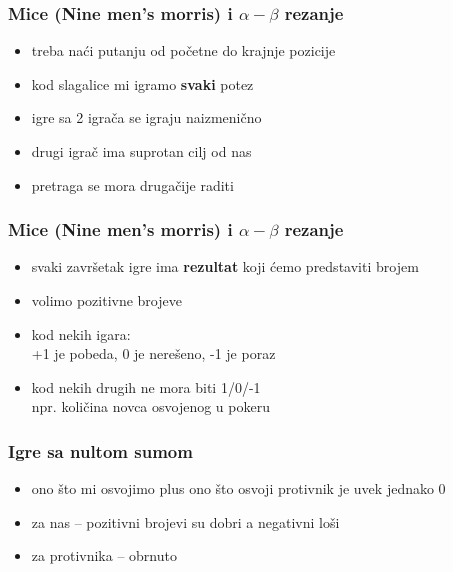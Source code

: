 \documentclass[compress,aspectratio=169]{beamer}
\begin{document}
\begin{frame}[fragile]
  \frametitle{Mice (Nine men's morris) i $\alpha-\beta$ rezanje}
  \begin{itemize}
    \item treba naći putanju od početne do krajnje pozicije
    \item kod slagalice mi igramo \textbf{svaki} potez
    \item igre sa 2 igrača se igraju naizmenično
    \item drugi igrač ima suprotan cilj od nas
    \item pretraga se mora drugačije raditi
  \end{itemize}
\end{frame}

\begin{frame}[fragile]
  \frametitle{Mice (Nine men's morris) i $\alpha-\beta$ rezanje}
  \begin{itemize}
    \item svaki završetak igre ima \textbf{rezultat} koji ćemo predstaviti brojem
    \item volimo pozitivne brojeve
    \item kod nekih igara: \\ +1 je pobeda, 0 je nerešeno, -1 je poraz
    \item kod nekih drugih ne mora biti 1/0/-1 \\ npr. količina novca osvojenog u pokeru
  \end{itemize}
\end{frame}

\begin{frame}[fragile]
  \frametitle{Igre sa nultom sumom}
  \begin{itemize}
    \item ono što mi osvojimo plus ono što osvoji protivnik je uvek jednako 0
    \item za nas -- pozitivni brojevi su dobri a negativni loši
    \item za protivnika -- obrnuto
  \end{itemize}
\end{frame}
\end{document}
